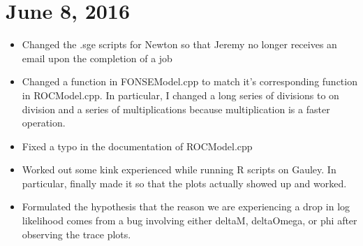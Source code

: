 \documentclass[12pt]{labbook}
\begin{document}
\section{June 8, 2016}

\begin{itemize}
    \item Changed the .sge scripts for Newton so that Jeremy no longer receives an email upon the completion of a job
    \item Changed a function in FONSEModel.cpp to match it's corresponding function in ROCModel.cpp. In particular, I changed a long series of divisions to on division and a series of multiplications because multiplication is a faster operation.
    \item Fixed a typo in the documentation of ROCModel.cpp
    \item Worked out some kink experienced while running R scripts on Gauley. In particular, finally made it so that the plots actually showed up and worked.
    \item Formulated the hypothesis that the reason we are experiencing a drop in log likelihood comes from a bug involving either deltaM, deltaOmega, or phi after observing the trace plots.
    \
\end{itemize}
\end{document}
